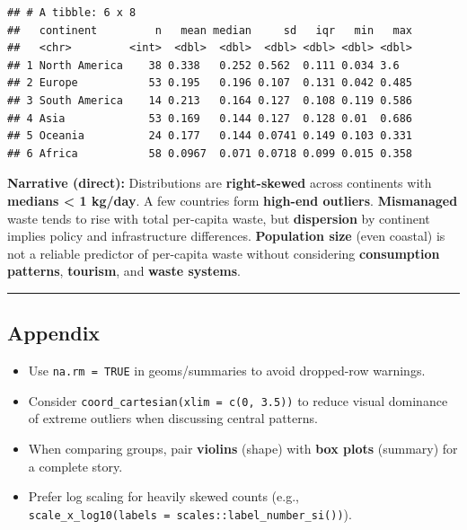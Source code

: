 \documentclass[
]{article}
\providecommand{\tightlist}{%
  \setlength{\itemsep}{0pt}\setlength{\parskip}{0pt}}
\begin{document}
\begin{verbatim}
## # A tibble: 6 x 8
##   continent         n   mean median     sd   iqr   min   max
##   <chr>         <int>  <dbl>  <dbl>  <dbl> <dbl> <dbl> <dbl>
## 1 North America    38 0.338   0.252 0.562  0.111 0.034 3.6  
## 2 Europe           53 0.195   0.196 0.107  0.131 0.042 0.485
## 3 South America    14 0.213   0.164 0.127  0.108 0.119 0.586
## 4 Asia             53 0.169   0.144 0.127  0.128 0.01  0.686
## 5 Oceania          24 0.177   0.144 0.0741 0.149 0.103 0.331
## 6 Africa           58 0.0967  0.071 0.0718 0.099 0.015 0.358
\end{verbatim}

\textbf{Narrative (direct):} Distributions are \textbf{right-skewed}
across continents with \textbf{medians \textless{} 1 kg/day}. A few
countries form \textbf{high-end outliers}. \textbf{Mismanaged} waste
tends to rise with total per-capita waste, but \textbf{dispersion} by
continent implies policy and infrastructure differences.
\textbf{Population size} (even coastal) is not a reliable predictor of
per-capita waste without considering \textbf{consumption patterns},
\textbf{tourism}, and \textbf{waste systems}.

\begin{center}\rule{0.5\linewidth}{0.5pt}\end{center}

\subsection{Appendix}\label{appendix}

\begin{itemize}
\tightlist
\item
  Use \texttt{na.rm\ =\ TRUE} in geoms/summaries to avoid dropped-row
  warnings.
\item
  Consider \texttt{coord\_cartesian(xlim\ =\ c(0,\ 3.5))} to reduce
  visual dominance of extreme outliers when discussing central patterns.
\item
  When comparing groups, pair \textbf{violins} (shape) with \textbf{box
  plots} (summary) for a complete story.
\item
  Prefer log scaling for heavily skewed counts (e.g.,
  \texttt{scale\_x\_log10(labels\ =\ scales::label\_number\_si())}).
\end{itemize}
\end{document}
